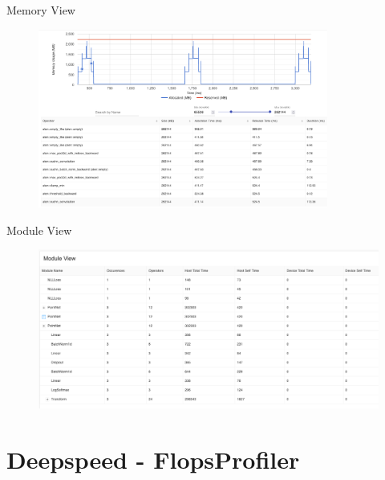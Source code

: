 \documentclass[compress,aspectratio=169]{beamer}
\begin{document}
\begin{frame}{Memory View}
    \vspace{-1em}
\begin{center}
    \begin{figure}
        \includegraphics[width=0.85\textwidth]{../../data/scap_gtx1080_profiler-torch_batch-size-64_14650758_memory-view}
    \end{figure}
    \end{center}
\end{frame}

\begin{frame}{Module View}
    \vspace{-1em}
\begin{center}
    \begin{figure}
        \includegraphics[width=1\textwidth]{../../data/scap_gtx1080_profiler-torch_batch-size-64_14650758_module-view}
    \end{figure}
    \end{center}
\end{frame}


\section{Deepspeed - FlopsProfiler}
\sectionIntro %
\end{document}
